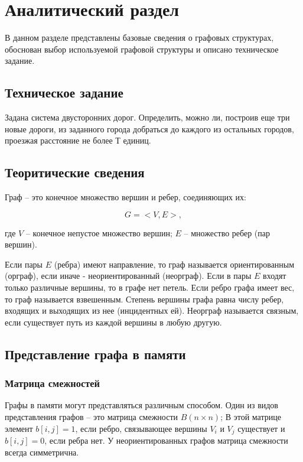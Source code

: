 \chapter{Аналитический раздел}

В данном разделе представлены базовые сведения о графовых структурах, обоснован выбор используемой графовой структуры и описано техническое задание.

\section{Техническое задание}

Задана система двусторонних дорог.
Определить, можно ли, построив еще три новые
дороги, из заданного города добраться до
каждого из остальных городов, проезжая
расстояние не более Т единиц.

\section{Теоритические сведения}

Граф – это конечное множество вершин и ребер, соединяющих их:

\begin{equation}
    G = < V, E >,
\end{equation}

где $V$ – конечное непустое множество вершин; $E$ – множество ребер (пар
вершин).

Если пары $E$ (ребра) имеют направление, то граф называется ориентированным
(орграф), если иначе - неориентированный (неорграф). Если в пары $E$ входят только
различные вершины, то в графе нет петель. Если ребро графа имеет вес, то граф
называется взвешенным. Степень вершины графа равна числу ребер, входящих и
выходящих из нее (инцидентных ей). Неорграф называется связным, если существует
путь из каждой вершины в любую другую.

\section{Представление графа в памяти}

\subsection{Матрица смежностей}

Графы в памяти могут представляться различным способом. Один из видов
представления графов – это матрица смежности $B(n\times n)$; В этой матрице элемент
$b[i,j] = 1$, если ребро, связывающее вершины $V_i$ и $V_j$ существует и $b[i,j] = 0$, если ребра
нет. У неориентированных графов матрица смежности всегда симметрична.

